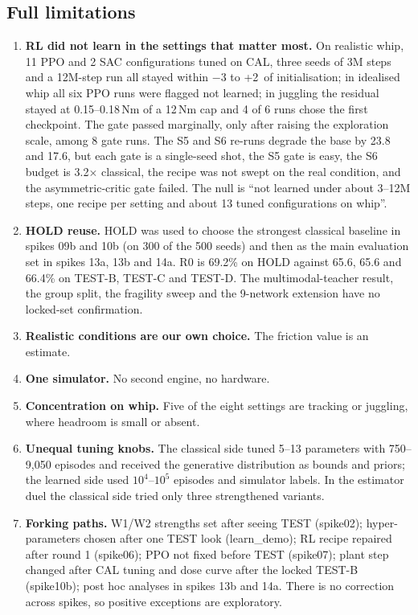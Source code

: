 \subsection{Full limitations}
\begin{enumerate}
\item \textbf{RL did not learn in the settings that matter most.} On realistic whip, 11 PPO and 2 SAC configurations tuned on CAL, three seeds of 3M steps and a 12M-step run all stayed within $-3$ to +2\pp\ of initialisation; in idealised whip all six PPO runs were flagged not learned; in juggling the residual stayed at 0.15--0.18\,Nm of a 12\,Nm cap and 4 of 6 runs chose the first checkpoint. The gate passed marginally, only after raising the exploration scale, among 8 gate runs. The S5 and S6 re-runs degrade the base by 23.8 and 17.6\pp, but each gate is a single-seed shot, the S5 gate is easy, the S6 budget is 3.2$\times$ classical, the recipe was not swept on the real condition, and the asymmetric-critic gate failed. The null is ``not learned under about 3--12M steps, one recipe per setting and about 13 tuned configurations on whip''.
\item \textbf{HOLD reuse.} HOLD was used to choose the strongest classical baseline in spikes 09b and 10b (on 300 of the 500 seeds) and then as the main evaluation set in spikes 13a, 13b and 14a. R0 is 69.2\% on HOLD against 65.6, 65.6 and 66.4\% on TEST-B, TEST-C and TEST-D. The multimodal-teacher result, the group split, the fragility sweep and the 9-network extension have no locked-set confirmation.
\item \textbf{Realistic conditions are our own choice.} The friction value is an estimate.
\item \textbf{One simulator.} No second engine, no hardware.
\item \textbf{Concentration on whip.} Five of the eight settings are tracking or juggling, where headroom is small or absent.
\item \textbf{Unequal tuning knobs.} The classical side tuned 5--13 parameters with 750--9{,}050 episodes and received the generative distribution as bounds and priors; the learned side used $10^4$--$10^5$ episodes and simulator labels. In the estimator duel the classical side tried only three strengthened variants.
\item \textbf{Forking paths.} W1/W2 strengths set after seeing TEST (spike02); hyper-parameters chosen after one TEST look (learn\_demo); RL recipe repaired after round 1 (spike06); PPO not fixed before TEST (spike07); plant step changed after CAL tuning and dose curve after the locked TEST-B (spike10b); post hoc analyses in spikes 13b and 14a. There is no correction across spikes, so positive exceptions are exploratory.

\end{enumerate}
